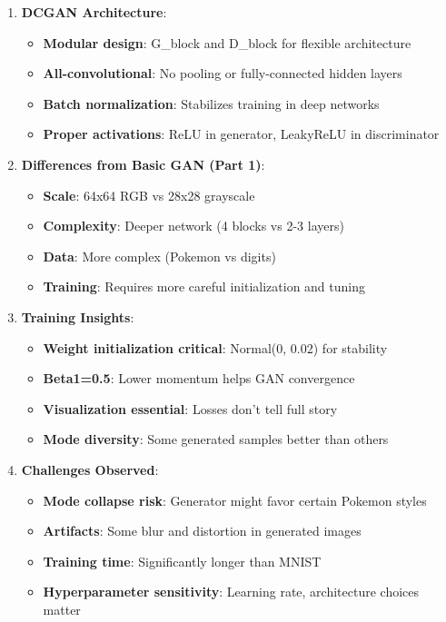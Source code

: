 \documentclass[11pt]{article}
\providecommand{\tightlist}{%
      \setlength{\itemsep}{0pt}\setlength{\parskip}{0pt}}
\begin{document}
\begin{enumerate}
\def\labelenumi{\arabic{enumi}.}
\tightlist
\item
  \textbf{DCGAN Architecture}:

  \begin{itemize}
  \tightlist
  \item
    \textbf{Modular design}: G\_block and D\_block for flexible
    architecture
  \item
    \textbf{All-convolutional}: No pooling or fully-connected hidden
    layers
  \item
    \textbf{Batch normalization}: Stabilizes training in deep networks
  \item
    \textbf{Proper activations}: ReLU in generator, LeakyReLU in
    discriminator
  \end{itemize}
\item
  \textbf{Differences from Basic GAN (Part 1)}:

  \begin{itemize}
  \tightlist
  \item
    \textbf{Scale}: 64x64 RGB vs 28x28 grayscale
  \item
    \textbf{Complexity}: Deeper network (4 blocks vs 2-3 layers)
  \item
    \textbf{Data}: More complex (Pokemon vs digits)
  \item
    \textbf{Training}: Requires more careful initialization and tuning
  \end{itemize}
\item
  \textbf{Training Insights}:

  \begin{itemize}
  \tightlist
  \item
    \textbf{Weight initialization critical}: Normal(0, 0.02) for
    stability
  \item
    \textbf{Beta1=0.5}: Lower momentum helps GAN convergence
  \item
    \textbf{Visualization essential}: Losses don't tell full story
  \item
    \textbf{Mode diversity}: Some generated samples better than others
  \end{itemize}
\item
  \textbf{Challenges Observed}:

  \begin{itemize}
  \tightlist
  \item
    \textbf{Mode collapse risk}: Generator might favor certain Pokemon
    styles
  \item
    \textbf{Artifacts}: Some blur and distortion in generated images
  \item
    \textbf{Training time}: Significantly longer than MNIST
  \item
    \textbf{Hyperparameter sensitivity}: Learning rate, architecture
    choices matter
  \end{itemize}
\end{enumerate}
\end{document}
